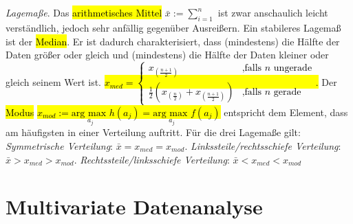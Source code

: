\\\\ 
\emph{Lagemaße}. Das \hl{arithmetisches Mittel} $\bar{x} := \sum^n_{i=1}$ ist zwar anschaulich leicht verständlich, jedoch sehr anfällig gegenüber Ausreißern. Ein stabileres Lagemaß ist der \hl{Median}. Er ist dadurch charakterisiert, dass (mindestens) die Hälfte der Daten größer oder gleich und (mindestens) die Hälfte der Daten kleiner oder gleich seinem Wert ist. \hl{$x_{med} = \begin{cases} x_{(\frac{n+1}{2})} & \text{,falls }n \text{ ungerade} \\
\frac{1}{2}(x_{(\frac{n}{2})} + x_{(\frac{n+1}{2})}) & \text{,falls }n \text{ gerade}
\end{cases}$.} Der \hl{Modus} \hl{$x_{mod} := \underset{a_j}{\text{arg }\text{max }}h(a_j) =\underset{a_j}{\text{arg }\text{max }}f(a_j)$} entspricht dem Element, dass am häufigsten in einer Verteilung auftritt. Für die drei Lagemaße gilt: \emph{Symmetrische Verteilung}: $\bar{x}=x_{med}=x_{mod}$. \emph{Linkssteile/rechtsschiefe Verteilung}: $\bar{x} > x_{med} > x_{mod}$. \emph{Rechtssteile/linksschiefe Verteilung}: $\bar{x}<x_{med}<x_{mod}$
\section{Multivariate Datenanalyse}
